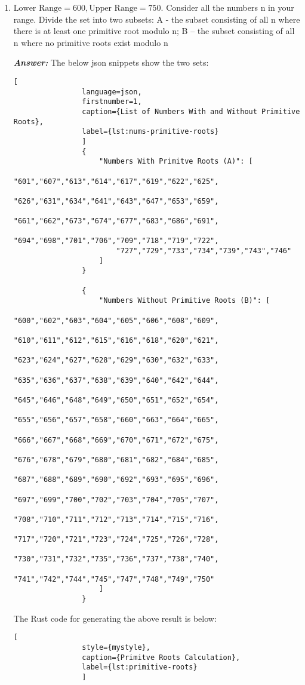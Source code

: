 \documentclass[11pt,a4paper,fleqn]{article}
\begin{document}
	\begin{enumerate}[1.]
		\item $\text{Lower Range} = 600, \text{Upper Range} = 750$. Consider all the numbers n in your range. Divide the set into two subsets:
		A - the subset consisting of all n where there is at least one primitive root modulo n; B – the subset consisting of all n where no primitive roots exist modulo n
		\bigskip
		\begin{flushleft}
			\textbf{\textit{Answer:}} The below json snippets show the two sets:
			\begin{lstlisting}[
				language=json,
				firstnumber=1,
				caption={List of Numbers With and Without Primitive Roots},
				label={lst:nums-primitive-roots}
				]
				{
					"Numbers With Primitve Roots (A)": [ 
						"601","607","613","614","617","619","622","625",
						"626","631","634","641","643","647","653","659",
						"661","662","673","674","677","683","686","691",
						"694","698","701","706","709","718","719","722",
						"727","729","733","734","739","743","746"
					]
				}

				{
					"Numbers Without Primitive Roots (B)": [
						"600","602","603","604","605","606","608","609",
						"610","611","612","615","616","618","620","621",
						"623","624","627","628","629","630","632","633",
						"635","636","637","638","639","640","642","644",
						"645","646","648","649","650","651","652","654",
						"655","656","657","658","660","663","664","665",
						"666","667","668","669","670","671","672","675",
						"676","678","679","680","681","682","684","685",
						"687","688","689","690","692","693","695","696",
						"697","699","700","702","703","704","705","707",
						"708","710","711","712","713","714","715","716",
						"717","720","721","723","724","725","726","728",
						"730","731","732","735","736","737","738","740",
						"741","742","744","745","747","748","749","750"
					]
				}
			\end{lstlisting}
			
			The Rust code for generating the above result is below:
			\begin{lstlisting}[
				style={mystyle},
				caption={Primitve Roots Calculation},
				label={lst:primitive-roots}
				]
				

\end{lstlisting}
\end{flushleft}
\end{enumerate}
\end{document}
